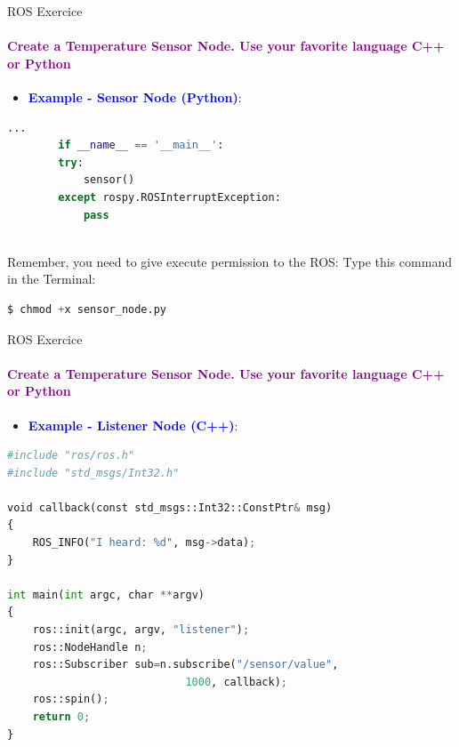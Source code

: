\documentclass[aspectratio=169]{beamer}
\begin{document}
\begin{frame}[fragile]{ROS Exercice}
	\framesubtitle{\textcolor{purple}{Create a Temperature Sensor Node. Use your favorite language C++ or Python}}
	\begin{minipage}{0.6\textwidth}
	\begin{itemize}
		\item \textcolor{blue}{\textbf{Example - Sensor Node (Python)}}:
	\end{itemize}
	\begin{lstlisting}[language=Python]
		...
		if __name__ == '__main__':
		try:
			sensor()
		except rospy.ROSInterruptException:
			pass
	
    \end{lstlisting}
	\begin{block}{Remember, you need to give execute permission to the ROS:}
		Type this command in the Terminal:
		\begin{lstlisting}[language=Python]
		$ chmod +x sensor_node.py
		\end{lstlisting}
	\end{block}
\end{minipage}
\begin{minipage}{0.4\textwidth}
	
\end{minipage}
\end{frame}


\begin{frame}[fragile]{ROS Exercice}
	\framesubtitle{\textcolor{purple}{Create a Temperature Sensor Node. Use your favorite language C++ or Python}}
	\begin{minipage}{0.6\textwidth}
	\begin{itemize}
		\item \textcolor{blue}{\textbf{Example - Listener Node (C++)}}:
	\end{itemize}
	\begin{lstlisting}[language=Python]
#include "ros/ros.h"
#include "std_msgs/Int32.h"

void callback(const std_msgs::Int32::ConstPtr& msg)
{
	ROS_INFO("I heard: %d", msg->data);
}

int main(int argc, char **argv)
{
	ros::init(argc, argv, "listener");
	ros::NodeHandle n;
	ros::Subscriber sub=n.subscribe("/sensor/value", 
							1000, callback);
	ros::spin();
	return 0;
}
	
    \end{lstlisting}
\end{minipage}
\begin{minipage}{0.4\textwidth}
	
\end{minipage}
\end{frame}
\end{document}
